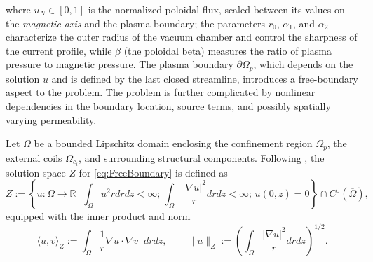 %
where $u_N \in [0,1]$ is the normalized poloidal flux, scaled between its values on the \textit{magnetic axis} and the plasma boundary; the parameters $r_0$, $\alpha_1$, and $\alpha_2$ characterize the outer radius of the vacuum chamber and control the sharpness of the current profile, while $\beta$ (the poloidal beta) measures the ratio of plasma pressure to magnetic pressure. The plasma boundary $\partial \Omega_p$, which depends on the solution $u$ and is defined by the last closed streamline, introduces a free-boundary aspect to the problem. The problem is further complicated by nonlinear dependencies in the boundary location, source terms, and possibly spatially varying permeability.



Let $\Omega$ be a bounded Lipschitz domain enclosing the confinement region $\Omega_p$, the external coils $\Omega_{c_i}$, and surrounding structural components.  Following \cite{Gr:1999}, the solution space $Z$ for \eqref{eq:FreeBoundary} is defined as
%
\begin{equation}\label{eq:Soln_space}
    Z:=\left\{u:\Omega\rightarrow \mathbb{R} \,\Bigg| \,\int_\Omega u^2rdrdz<\infty; \,  \int_\Omega\frac{|\nabla u|^2}{r}drdz<\infty; \, u(0,z)=0 \right\}\cap C^0(\overline{\Omega}),
\end{equation}
%
equipped with the inner product and norm
%
\[
    \langle u,v\rangle_Z := \int_{\Omega} \frac{1}{r} \nabla u\cdot\nabla v \;\;drdz,\qquad \| u \|_{Z} :=\left(\int_\Omega\frac{|\nabla u|^2}{r} drdz\right)^{1/2}.
\]
%


